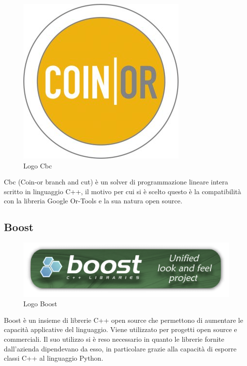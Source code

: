 \begin{figure}[H]
	\begin{center} \includegraphics[scale=0.8]{figures/coin_banner}
		\caption[Logo Cbc]{Logo Cbc}  
	\end{center}
\end{figure}
Cbc (Coin-or branch and cut) è un solver di programmazione lineare intera scritto in linguaggio C++, il motivo per cui si è scelto questo è la compatibilità con la libreria Google Or-Tools e la sua natura open source.

\subsection{Boost}
\begin{figure}[H]
	\begin{center} \includegraphics[scale=0.8]{figures/boost}
		\caption[Logo Boost]{Logo Boost}
	\end{center}
\end{figure}
Boost è un insieme di librerie C++ open source che permettono di aumentare le capacità applicative del linguaggio. Viene utilizzato per progetti open source e commerciali. Il suo utilizzo si è reso necessario in quanto le librerie fornite dall'azienda dipendevano da esso, in particolare grazie alla capacità di esporre classi C++ al linguaggio Python.

